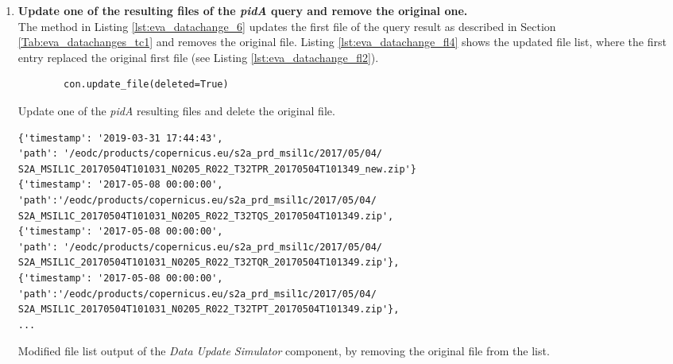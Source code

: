 \documentclass[draft,final]{vutinfth} %
\newenvironment{code}{\captionsetup{type=listing}}{}
\begin{document}
\begin{enumerate}
	\setcounter{enumi}{+1}
	\item \textbf{Update one of the resulting files of the \textit{pidA} query and remove the original one.}\\ 
	The method in Listing \ref{lst:eva_datachange_6} updates the first file of the query result as described in Section \ref{Tab:eva_datachanges_tc1} and removes the original file. Listing \ref{lst:eva_datachange_fl4} shows the updated file list, where the first entry replaced the original first file (see Listing \ref{lst:eva_datachange_fl2}).
	\begin{code}
		\begin{verbatim}
		con.update_file(deleted=True)
		\end{verbatim}
		\caption{Update one of the \textit{pidA} resulting files and delete the original file.}
		\label{lst:eva_datachange_6}
	\end{code}
	
	\begin{code}
		\begin{verbatim} 
{'timestamp': '2019-03-31 17:44:43', 
'path': '/eodc/products/copernicus.eu/s2a_prd_msil1c/2017/05/04/
S2A_MSIL1C_20170504T101031_N0205_R022_T32TPR_20170504T101349_new.zip'}
{'timestamp': '2017-05-08 00:00:00',
'path':'/eodc/products/copernicus.eu/s2a_prd_msil1c/2017/05/04/
S2A_MSIL1C_20170504T101031_N0205_R022_T32TQS_20170504T101349.zip', 
{'timestamp': '2017-05-08 00:00:00', 
'path': '/eodc/products/copernicus.eu/s2a_prd_msil1c/2017/05/04/
S2A_MSIL1C_20170504T101031_N0205_R022_T32TQR_20170504T101349.zip'}, 
{'timestamp': '2017-05-08 00:00:00',
'path':'/eodc/products/copernicus.eu/s2a_prd_msil1c/2017/05/04/
S2A_MSIL1C_20170504T101031_N0205_R022_T32TPT_20170504T101349.zip'},
...
		\end{verbatim}
		\caption{Modified file list output of the \textit{Data Update Simulator} component, by removing the original file from the list.}
		\label{lst:eva_datachange_fl4}
	\end{code}	


\end{enumerate}
\end{document}
